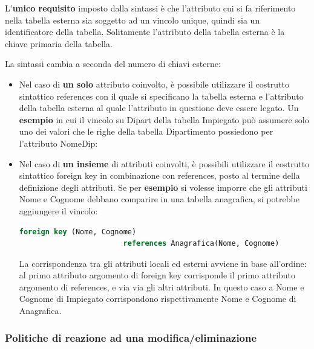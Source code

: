 \documentclass[a4paper]{article}
\begin{document}
	L'\textbf{unico requisito} imposto dalla sintassi è che l'attributo cui si fa riferimento nella tabella esterna sia soggetto ad un vincolo \textsf{unique}, quindi sia un identificatore della tabella. Solitamente l'attributo della tabella esterna è la chiave primaria della tabella.\newline
	
	\noindent
	La sintassi cambia a seconda del numero di chiavi esterne:
	\begin{itemize}
		\item Nel caso di \textbf{un solo} attributo coinvolto, è possibile utilizzare il costrutto sintattico \textsf{references} con il quale si specificano la tabella esterna e l'attributo della tabella esterna al quale l'attributo in questione deve essere legato.\newline
		Un \textcolor{Green4}{\textbf{esempio}} in cui il vincolo su \textsf{Dipart} della tabella Impiegato può assumere solo uno dei valori che le righe della tabella Dipartimento possiedono per l'attributo \textsf{NomeDip}:
		
		
		\item Nel caso di \textbf{un insieme} di attributi coinvolti, è possibili utilizzare il costrutto sintattico \textsf{foreign key} in combinazione con \textsf{references}, posto al termine della definizione degli attributi.\newline
		Se per \textcolor{Green4}{\textbf{esempio}} si volesse imporre che gli attributi \textsf{Nome} e \textsf{Cognome} debbano comparire in una tabella anagrafica, si potrebbe aggiungere il vincolo:
\begin{lstlisting}[language=SQL]
foreign key (Nome, Cognome)
						references Anagrafica(Nome, Cognome)\end{lstlisting}
		La corrispondenza tra gli attributi locali ed esterni avviene in base all'ordine: al primo attributo argomento di \textsf{foreign key} corrisponde il primo attributo argomento di \textsf{references}, e via via gli altri attributi. In questo caso a \textsf{Nome} e \textsf{Cognome} di Impiegato corrispondono rispettivamente \textsf{Nome} e \textsf{Cognome} di Anagrafica.
	\end{itemize}\newpage
	
	\subsubsection{Politiche di reazione ad una modifica/eliminazione}\label{politiche di reazione ad una modifica/eliminazione}
	
\end{document}
